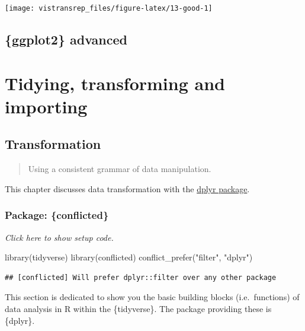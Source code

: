 \documentclass[]{book}
\newenvironment{Shaded}{}{}
\newcommand{\KeywordTok}[1]{\textcolor[rgb]{0.00,0.00,1.00}{#1}}
\newcommand{\NormalTok}[1]{#1}
\newcommand{\StringTok}[1]{\textcolor[rgb]{0.00,0.50,0.50}{#1}}
\begin{document}
\begin{flushright}\texttt{[image: vistransrep\_files/figure-latex/13-good-1]} \end{flushright}

\hypertarget{vis-adv}{%
\chapter{\{ggplot2\} advanced}\label{vis-adv}}

\hypertarget{part-tidying-transforming-and-importing}{%
\part{Tidying, transforming and importing}\label{part-tidying-transforming-and-importing}}

\hypertarget{transformation}{%
\chapter{Transformation}\label{transformation}}

\begin{quote}
Using a consistent grammar of data manipulation.
\end{quote}

This chapter discusses data transformation with the \href{https://dplyr.tidyverse.org/}{dplyr package}.

\hypertarget{package-conflicted}{%
\section{Package: \{conflicted\}}\label{package-conflicted}}

\emph{Click here to show setup code.}

\begin{Shaded}
\begin{Highlighting}[]
\KeywordTok{library}\NormalTok{(tidyverse)}
\KeywordTok{library}\NormalTok{(conflicted)}
\KeywordTok{conflict_prefer}\NormalTok{(}\StringTok{"filter"}\NormalTok{, }\StringTok{"dplyr"}\NormalTok{)}
\end{Highlighting}
\end{Shaded}

\begin{verbatim}
## [conflicted] Will prefer dplyr::filter over any other package
\end{verbatim}

This section is dedicated to show you the basic building blocks (i.e.~functions) of data analysis in R within the \{tidyverse\}.
The package providing these is \{dplyr\}.
\end{document}
